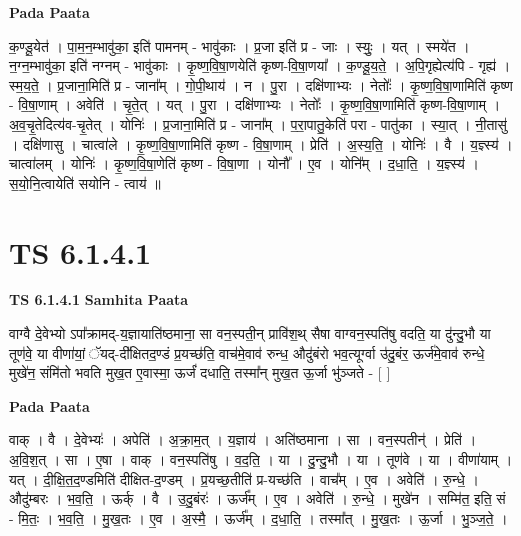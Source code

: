 \documentclass[17pt]{extarticle}
\begin{document}
\textbf{Pada Paata} \newline

क॒ण्डू॒येत॑ । पा॒म॒न॒म्भावु॑का॒ इति॑ पामनम् - भावु॑काः । प्र॒जा इति॑ प्र - जाः । स्युः॒ । यत् । स्मये॑त । न॒ग्न॒म्भावु॑का॒ इति॑ नग्नम् - भावु॑काः । कृ॒ष्ण॒वि॒षा॒णयेति॑ कृष्ण-वि॒षा॒णया᳚ । क॒ण्डू॒य॒ते॒ । अ॒पि॒गृह्येत्य॑पि - गृह्य॑ । स्म॒य॒ते॒ । प्र॒जाना॒मिति॑ प्र - जाना᳚म् । गो॒पी॒थाय॑ । न । पु॒रा । दक्षि॑णाभ्यः । नेतोः᳚ । कृ॒ष्ण॒वि॒षा॒णामिति॑ कृष्ण - वि॒षा॒णाम् । अवेति॑ । चृ॒ते॒त् । यत् । पु॒रा । दक्षि॑णाभ्यः । नेतोः᳚ । कृ॒ष्ण॒वि॒षा॒णामिति॑ कृष्ण-वि॒षा॒णाम् । अ॒व॒चृ॒तेदित्य॑व-चृ॒तेत् । योनिः॑ । प्र॒जाना॒मिति॑ प्र - जाना᳚म् । प॒रा॒पातु॒केति॑ परा - पातु॑का । स्या॒त् । नी॒तासु॑ । दक्षि॑णासु । चात्वा॑ले । कृ॒ष्ण॒वि॒षा॒णामिति॑ कृष्ण - वि॒षा॒णाम् । प्रेति॑ । अ॒स्य॒ति॒ । योनिः॑ । वै । य॒ज्ञ्स्य॑ । चात्वा॑लम् । योनिः॑ । कृ॒ष्ण॒वि॒षा॒णेति॑ कृष्ण - वि॒षा॒णा । योनौ᳚ । ए॒व । योनि᳚म् । द॒धा॒ति॒ । य॒ज्ञ्स्य॑ । स॒यो॒नि॒त्वायेति॑ सयोनि - त्वाय॑ ॥  \newline





\section{ TS 6.1.4.1 }

\textbf{TS 6.1.4.1 } \newline
\textbf{Samhita Paata} \newline

वाग्वै दे॒वेभ्यो ऽपा᳚क्रामद्-य॒ज्ञायाति॑ष्ठमाना॒ सा वन॒स्पती॒न् प्रावि॑श॒थ् सैषा वाग्वन॒स्पति॑षु वदति॒ या दु॑न्दु॒भौ या तूण॑वे॒ या वीणा॑यां॒ ॅयद्-दी᳚क्षितद॒ण्डं प्र॒यच्छ॑ति॒ वाच॑मे॒वाव॑ रुन्ध॒ औदु॑बंरो भव॒त्यूर्ग्वा उ॑दु॒बंर॒ ऊर्ज॑मे॒वाव॑ रुन्धे॒ मुखे॑न॒ संमि॑तो भवति मुख॒त ए॒वास्मा॒ ऊर्जं॑ दधाति॒ तस्मा᳚न् मुख॒त ऊ॒र्जा भु॑ञ्जते - [  ] \newline

\textbf{Pada Paata} \newline

वाक् । वै । दे॒वेभ्यः॑ । अपेति॑ । अ॒क्रा॒म॒त् । य॒ज्ञाय॑ । अति॑ष्ठमाना । सा । वन॒स्पतीन्॑ । प्रेति॑ । अ॒वि॒श॒त् । सा । ए॒षा । वाक् । वन॒स्पति॑षु । व॒द॒ति॒ । या । दु॒न्दु॒भौ । या । तूण॑वे । या । वीणा॑याम् । यत् । दी॒क्षि॒त॒द॒ण्डमिति॑ दीक्षित-द॒ण्डम् । प्र॒यच्छ॒तीति॑ प्र-यच्छ॑ति । वाच᳚म् । ए॒व । अवेति॑ । रु॒न्धे॒ । औदु॑म्बरः । भ॒व॒ति॒ । ऊर्क् । वै । उ॒दु॒बंरः॑ । ऊर्ज᳚म् । ए॒व । अवेति॑ । रु॒न्धे॒ । मुखे॑न । सम्मि॑त॒ इति॒ सं - मि॒तः॒ । भ॒व॒ति॒ । मु॒ख॒तः । ए॒व । अ॒स्मै॒ । ऊर्ज᳚म् । द॒धा॒ति॒ । तस्मा᳚त् । मु॒ख॒तः । ऊ॒र्जा । भु॒ञ्ज॒ते॒ ।  \newline
\end{document}

